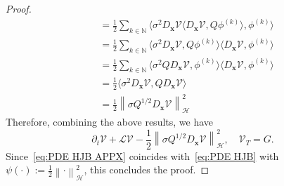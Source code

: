 \documentclass[nohyperref]{article}
\theoremstyle{plain}
\theoremstyle{remark}
\newcommand{\la}{\langle}
\newcommand{\ra}{\rangle}
\newcommand{\mc}{\mathcal}
\newcommand{\mb}{\mathbf}
\newcommand{\norm}[1]{\left\lVert#1\right\rVert}
\begin{document}
\begin{proof}
\begin{align}
    & = \frac{1}{2}\sum_{k \in \mathbb{N}} \la \sigma^2  D_{\mb{x}} \mc{V} \la D_{\mb{x}}\mc{V}, Q \phi^{(k)}\ra, \phi^{(k)}  \ra  \\
    & = \frac{1}{2}\sum_{k \in \mathbb{N}} \la \sigma^2  D_{\mb{x}}\mc{V}, Q \phi^{(k)}\ra \la D_{\mb{x}}\mc{V}, \phi^{(k)}  \ra  \\
    & = \frac{1}{2}\sum_{k \in \mathbb{N}} \la \sigma^2  Q D_{\mb{x}}\mc{V}, \phi^{(k)}\ra \la D_{\mb{x}}\mc{V}, \phi^{(k)}  \ra  \\
    & = \frac{1}{2} \la \sigma^2  D_{\mb{x}}\mc{V}, Q D_{\mb{x}}\mc{V} \ra \\
    & = \frac{1}{2} \norm{\sigma Q^{1/2} D_{\mb{x}}\mc{V}}_{\mc{H}}^2
\end{align}
Therefore, combining the above results, we have
\begin{equation}\label{eq:PDE HJB APPX}
\partial_t \mc{V}  + \mathcal{L} \mc{V} - \frac{1}{2} \norm{\sigma Q^{1/2 }D_{\mb{x}}\mc{V}}_{\mc{H}}^2, \quad \mc{V}_T = G.
\end{equation}
Since~\eqref{eq:PDE HJB APPX} coincides with~\eqref{eq:PDE HJB} with $\psi(\cdot) := \frac{1}{2}\norm{\cdot}^2_{\mc{H}}$, this concludes the proof.
\end{proof}
\end{document}
